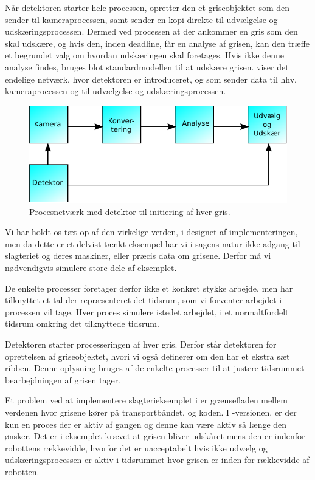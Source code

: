 Når detektoren starter hele processen, opretter den et griseobjektet som den sender til kameraprocessen, samt sender en kopi direkte til udvælgelse og udskæringsprocessen. Dermed ved processen at der ankommer en gris som den skal udskære, og hvis den, inden deadline, får en analyse af grisen, kan den træffe et begrundet valg om hvordan udskæringen skal foretages. Hvis ikke denne analyse findes, bruges blot standardmodellen til at udskære grisen.  viser det endelige  netværk, hvor detektoren er introduceret, og som sender data til hhv. kameraprocessen og til udvælgelse og udskæringsprocessen. 

\begin{figure}
 \begin{center}
  \includegraphics[scale=1]{images/pig-network2}
	\caption{Procesnetværk med detektor til initiering af hver gris.}
	\label{fig:pig-network2}
\end{center}
\end{figure}

Vi har holdt os tæt op af den virkelige verden, i designet af implementeringen, men da dette er et delvist tænkt eksempel har vi i  sagens natur ikke  adgang til slagteriet og deres maskiner, eller præcis data om grisene. Derfor må vi nødvendigvis simulere store dele af eksemplet. 

De enkelte processer foretager derfor ikke et konkret stykke arbejde, men har  tilknyttet et tal der repræsenteret det tidsrum, som vi forventer arbejdet i processen vil tage. Hver proces simulere istedet arbejdet, i et  normaltfordelt tidsrum omkring det tilknyttede tidsrum.

Detektoren starter processeringen af hver gris. Derfor står detektoren for oprettelsen af griseobjektet, hvori vi også  definerer om den har et ekstra sæt ribben. Denne oplysning bruges af de enkelte processer til at justere tidsrummet bearbejdningen af grisen tager. 

Et problem ved at implementere slagterieksemplet i \pycsp er  grænsefladen mellem verdenen hvor grisene kører på transportbåndet, og  koden. I -versionen.   er der kun  en proces  der er aktiv af gangen og denne kan være aktiv så længe den ønsker. Det er i eksemplet  krævet at  grisen bliver udskåret mens den er indenfor robottens rækkevidde, hvorfor det er uacceptabelt hvis ikke udvælg og udskæringsprocessen er aktiv i tidsrummet hvor grisen er inden for rækkevidde af robotten. 


